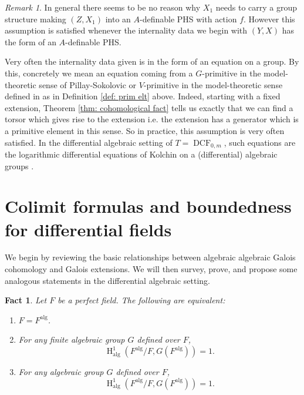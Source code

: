 \documentclass{amsart}
\newtheorem{fact}[theorem]{Fact}
\theoremstyle{definition}
\theoremstyle{remark}
\newtheorem{remark}[theorem]{Remark}
\numberwithin{equation}{section}
\def \HH {\operatorname{H}}
\def \alg {\operatorname{alg}}
\def \DCF {\operatorname{DCF}}
\begin{document}
\begin{remark}\label{rmk: assmp ii}
In general there seems to be no reason why $X_1$ needs to carry a group structure making $(Z,X_1)$ into an $A$-definable PHS with action $f$. However this assumption is satisfied whenever the internality data we begin with $(Y,X)$ has the form of an $A$-definable PHS. 

Very often the internality data given is in the form of an equation on a group. By this, concretely we mean an equation coming from a $G$-primitive in the model-theoretic sense of Pillay-Sokolovic or $V$-primitive in the model-theoretic sense defined in \cite{MeretzkyThesis} as in Definition \ref{def: prim elt} above. Indeed, starting with a fixed extension, Theorem \ref{thm: cohomological fact} \cite{OmarDavid2026} tells us exactly that we can find a torsor which gives rise to the extension i.e. the extension has a generator which is a primitive element in this sense.  So in practice, this assumption is very often satisfied. In the differential algebraic setting of $T=\DCF_{0,m}$, such equations are the logarithmic differential equations of Kolchin on a (differential) algebraic groups \cite{OmarDavid2026}. %
\end{remark}%




\section{Colimit formulas and boundedness for differential fields}\label{sec: colim diff}

We begin by reviewing the basic relationships between algebraic algebraic Galois cohomology and Galois extensions. We will then survey, prove, and propose some analogous statements in the differential algebraic setting.  

\begin{fact}\label{fact: alg coh triv} \cite{Serre1979}
    Let $F$ be a perfect field. The following are equivalent:
    
    \begin{enumerate}
        \item $F = F^{\alg}$.
        \item For any finite algebraic group $G$ defined over $F$, $$\HH^1_{\alg}(F^{\alg}/F,G(F^{\alg})) = 1.$$
        \item For any algebraic group $G$ defined over $F$, $$\HH^1_{\alg}(F^{\alg}/F,G(F^{\alg})) = 1.$$
    \end{enumerate}
\end{fact}
\end{document}

